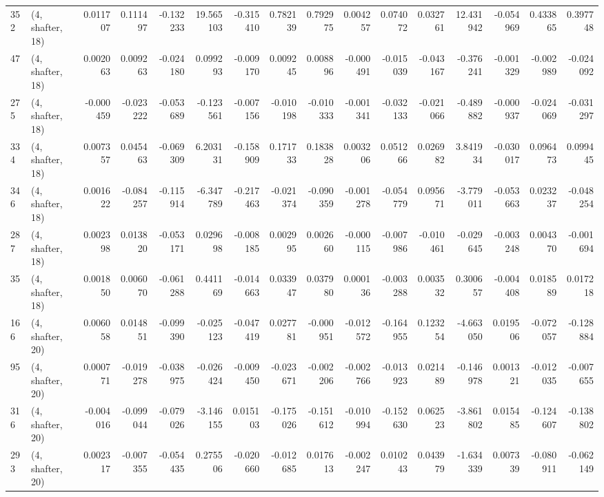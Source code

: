 \begin{tabular}{llrrrrrrrrrrrrrr}
352 &  (4, shafter, 18) &   0.011707 &  0.111497 & -0.132233 &   19.565103 & -0.315410 &   0.782139 &  0.792975 &  0.004257 &  0.074072 &  0.032761 &   12.431942 & -0.054969 &  0.433865 &  0.397748 \\
47  &  (4, shafter, 18) &   0.002063 &  0.009263 & -0.024180 &    0.099293 & -0.009170 &   0.009245 &  0.008896 & -0.000491 & -0.015039 & -0.043167 &   -0.376241 & -0.001329 & -0.002989 & -0.024092 \\
275 &  (4, shafter, 18) &  -0.000459 & -0.023222 & -0.053689 &   -0.123561 & -0.007156 &  -0.010198 & -0.010333 & -0.001341 & -0.032133 & -0.021066 &   -0.489882 & -0.000937 & -0.024069 & -0.031297 \\
334 &  (4, shafter, 18) &   0.007357 &  0.045463 & -0.069309 &    6.203131 & -0.158909 &   0.171733 &  0.183828 &  0.003206 &  0.051266 &  0.026982 &    3.841934 & -0.030017 &  0.096473 &  0.099445 \\
346 &  (4, shafter, 18) &   0.001622 & -0.084257 & -0.115914 &   -6.347789 & -0.217463 &  -0.021374 & -0.090359 & -0.001278 & -0.054779 &  0.095671 &   -3.779011 & -0.053663 &  0.023237 & -0.048254 \\
287 &  (4, shafter, 18) &   0.002398 &  0.013820 & -0.053171 &    0.029698 & -0.008185 &   0.002995 &  0.002660 & -0.000115 & -0.007986 & -0.010461 &   -0.029645 & -0.003248 &  0.004370 & -0.001694 \\
35  &  (4, shafter, 18) &   0.001850 &  0.006070 & -0.061288 &    0.441169 & -0.014663 &   0.033947 &  0.037980 &  0.000136 & -0.003288 &  0.003532 &    0.300657 & -0.004408 &  0.018589 &  0.017218 \\
166 &  (4, shafter, 20) &   0.006058 &  0.014851 & -0.099390 &   -0.025123 & -0.047419 &   0.027781 & -0.000951 & -0.012572 & -0.164955 &  0.123254 &   -4.663050 &  0.019506 & -0.072057 & -0.128884 \\
95  &  (4, shafter, 20) &   0.000771 & -0.019278 & -0.038975 &   -0.026424 & -0.009450 &  -0.023671 & -0.002206 & -0.002766 & -0.013923 &  0.021489 &   -0.146978 &  0.001321 & -0.012035 & -0.007655 \\
316 &  (4, shafter, 20) &  -0.004016 & -0.099044 & -0.079026 &   -3.146155 &  0.015103 &  -0.175026 & -0.151612 & -0.010994 & -0.152630 &  0.062523 &   -3.861802 &  0.015485 & -0.124607 & -0.138802 \\
293 &  (4, shafter, 20) &   0.002317 & -0.007355 & -0.054435 &    0.275506 & -0.020660 &  -0.012685 &  0.017613 & -0.002247 &  0.010243 &  0.043979 &   -1.634339 &  0.007339 & -0.080911 & -0.062149 \\

\end{tabular}
